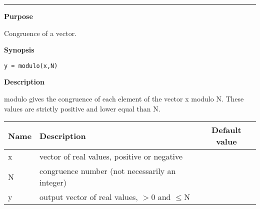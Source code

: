 


\hspace*{-1.6cm}{\Large \bf modulo}

\vspace*{-.4cm}
\hspace*{-1.6cm}\rule[0in]{16.5cm}{.02cm}
\vspace*{.2cm}



{\bf \large {}\selectfont Purpose}\\
\hspace*{1.5cm}
\begin{minipage}[t]{13.5cm}
Congruence of a vector.
\end{minipage}
\vspace*{.5cm}


{\bf \large {}\selectfont Synopsis}\\
\hspace*{1.5cm}
\begin{minipage}[t]{13.5cm}
\begin{verbatim}
y = modulo(x,N)
\end{verbatim}
\end{minipage}
\vspace*{.5cm}


{\bf \large {}\selectfont Description}\\
\hspace*{1.5cm}
\begin{minipage}[t]{13.5cm}
        {\ty modulo} gives the congruence of each element of the vector
   {\ty x} modulo {\ty N}. These values are strictly positive and lower
   equal than {\ty N}.\\

\hspace*{-.5cm}\begin{tabular*}{14cm}{p{1.5cm} p{8.5cm} c}
Name & Description & Default value\\
\hline
	{\ty x} & vector of real values, positive or negative\\
	{\ty N} & congruence number (not necessarily an integer)\\
\hline	{\ty y} & output vector of real values, $>$0 and $\leq${\ty N}\\

\hline
\end{tabular*}

\end{minipage}
\vspace*{1cm}


